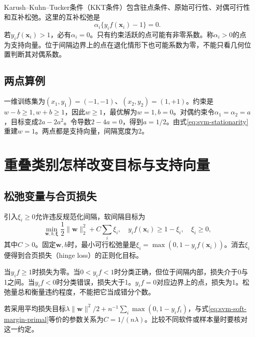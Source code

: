 Karush--Kuhn--Tucker条件（KKT条件）包含驻点条件、原始可行性、对偶可行性和互补松弛。这里的互补松弛是
\begin{equation}
 \alpha_i\{y_if(\bm x_i)-1\}=0.
 \label{eq:svm-hard-kkt}
\end{equation}
若$y_if(\bm x_i)>1$，必有$\alpha_i=0$。只有约束活跃的点可能有非零系数。称$\alpha_i>0$的点为支持向量。位于间隔边界上的点在退化情形下也可能系数为零，不能只看几何位置判断其对偶系数。

\subsection{两点算例}
一维训练集为$(x_1,y_1)=(-1,-1)$、$(x_2,y_2)=(1,+1)$。约束是$w-b\ge1,w+b\ge1$，因此$w\ge1$，最优解为$w=1,b=0$。对偶约束令$\alpha_1=\alpha_2=a$，目标变成$2a-2a^2$。令导数$2-4a=0$，得到$a=1/2$。由式\eqref{eq:svm-stationarity}重建$w=1$。两点都是支持向量，间隔宽度为2。

\section{重叠类别怎样改变目标与支持向量}
\subsection{松弛变量与合页损失}
引入$\xi_i\ge0$允许违反规范化间隔，软间隔目标为
\begin{equation}
 \min_{\bm w,b,\bm\xi}\frac12\|\bm w\|_2^2+C\sum_i\xi_i,
 \quad y_if(\bm x_i)\ge1-\xi_i,\quad\xi_i\ge0,
 \label{eq:svm-soft-margin-primal}
\end{equation}
其中$C>0$。固定$\bm w,b$时，最小可行松弛量是$\xi_i=\max(0,1-y_if(\bm x_i))$。消去$\xi_i$便得到合页损失（hinge loss）的正则化目标。

当$y_if\ge1$时损失为零。当$0<y_if<1$时分类正确，但位于间隔内部，损失介于0与1之间。当$y_if<0$时分类错误，损失大于1。$y_if=0$对应边界上的点，损失为1。松弛量总和衡量违约程度，不能把它当成错分个数。

若采用平均损失目标$\lambda\|\bm w\|^2/2+n^{-1}\sum_i\max(0,1-y_if_i)$，与式\eqref{eq:svm-soft-margin-primal}等价的参数关系为$C=1/(n\lambda)$。比较不同软件或样本量时要核对这一约定。

